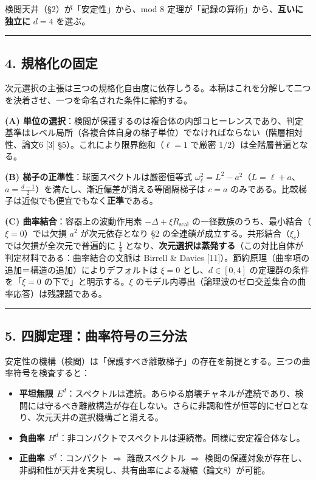 \documentclass[
]{ltjsarticle}
\providecommand{\tightlist}{%
  \setlength{\itemsep}{0pt}\setlength{\parskip}{0pt}}
\begin{document}
検閲天井（§2）が「安定性」から、mod 8
定理が「記録の算術」から、\textbf{互いに独立に} \(d=4\) を選ぶ。

\begin{center}\rule{0.5\linewidth}{0.5pt}\end{center}

\subsection{4. 規格化の固定}\label{ux898fux683cux5316ux306eux56faux5b9a}

次元選択の主張は三つの規格化自由度に依存しうる。本稿はこれを分解して二つを決着させ、一つを命名された条件に縮約する。

\textbf{(A)
単位の選択}：検閲が保護するのは複合体の内部コヒーレンスであり、判定基準はレベル局所（各複合体自身の梯子単位）でなければならない（階層相対性、論文6
{[}3{]} §5）。これにより限界飽和（\(\ell=1\) で厳密
\(1/2\)）は全階層普遍となる。

\textbf{(B) 梯子の正準性}：球面スペクトルは厳密恒等式
\(\omega_\ell^2=L^2-a^2\)（\(L=\ell+a\)、\(a=\tfrac{d-1}2\)）を満たし、漸近偏差が消える等間隔梯子は
\(c=a\) のみである。比較梯子は近似でも便宜でもなく\textbf{正準}である。

\textbf{(C) 曲率結合}：容器上の波動作用素
\(-\Delta+\xi R_{\mathrm{scal}}\)
の一径数族のうち、最小結合（\(\xi=0\)）では欠損 \(a^2\) が次元依存となり
§2 の全連鎖が成立する。共形結合（\(\xi_c\)）では欠損が全次元で普遍的に
\(\tfrac14\)
となり、\textbf{次元選択は蒸発する}（この対比自体が判定材料である：曲率結合の文脈は
Birrell \& Davies
{[}11{]}）。節約原理（曲率項の追加＝構造の追加）によりデフォルトは
\(\xi=0\) とし、\(d\in[0,4]\) の定理群の条件を「\(\xi=0\)
の下で」と明示する。\(\xi\)
のモデル内導出（論理波のゼロ交差集合の曲率応答）は残課題である。

\begin{center}\rule{0.5\linewidth}{0.5pt}\end{center}

\subsection{5.
四脚定理：曲率符号の三分法}\label{ux56dbux811aux5b9aux7406ux66f2ux7387ux7b26ux53f7ux306eux4e09ux5206ux6cd5}

安定性の機構（検閲）は「保護すべき離散梯子」の存在を前提とする。三つの曲率符号を検査すると：

\begin{itemize}
\tightlist
\item
  \textbf{平坦無限
  \(E^d\)}：スペクトルは連続。あらゆる崩壊チャネルが連続であり、検閲には守るべき離散構造が存在しない。さらに非調和性が恒等的にゼロとなり、次元天井の選択機構ごと消える。
\item
  \textbf{負曲率
  \(H^d\)}：非コンパクトでスペクトルは連続帯。同様に安定複合体なし。
\item
  \textbf{正曲率 \(S^d\)}：コンパクト $\Longrightarrow$ 離散スペクトル $\Longrightarrow$
  検閲の保護対象が存在し、非調和性が天井を実現し、共有曲率による凝縮（論文8）が可能。
\end{itemize}
\end{document}
